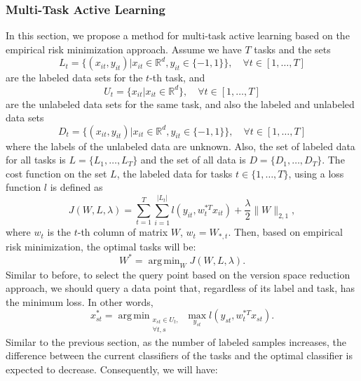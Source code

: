 \documentclass[12pt]{article}
\DeclareMathOperator*{\argmin}{arg\,min}
\begin{document}
	\subsubsection{Multi-Task Active Learning}
	In this section, we propose a method for multi-task active learning based on the empirical risk minimization approach. Assume we have $T$ tasks and the sets
	\begin{equation}
		L_t = \{(x_{it}, y_{it}) | x_{it} \in \mathbb{R}^d, y_{it} \in \{-1, 1\}\}, \quad \forall t \in [1, \ldots, T]
	\end{equation}
	are the labeled data sets for the $t$-th task, and
	\begin{equation}
		U_t = \{x_{it} | x_{it} \in \mathbb{R}^d\}, \quad \forall t \in [1, \ldots, T]
	\end{equation}
	are the unlabeled data sets for the same task, and also the labeled and unlabeled data sets
	\begin{equation}
		D_t = \{(x_{it}, y_{it}) | x_{it} \in \mathbb{R}^d, y_{it} \in \{-1, 1\}\}, \quad \forall t \in [1, \ldots, T]
	\end{equation}
	where the labels of the unlabeled data are unknown. Also, the set of labeled data for all tasks is $L = \{L_1, \ldots, L_T\}$ and the set of all data is $D = \{D_1, \ldots, D_T\}$. The cost function on the set $L$, the labeled data for tasks $t \in \{1, \ldots, T\}$, using a loss function $l$ is defined as
	\begin{equation}
		J(W, L, \lambda) = \sum_{t=1}^{T} \sum_{i=1}^{|L_t|} l(y_{it}, w_t^{*T} x_{it}) + \frac{\lambda}{2}\|W\|_{2,1},
	\end{equation}
	where $w_t$ is the $t$-th column of matrix $W$, $w_t = W_{*,t}$. Then, based on empirical risk minimization, the optimal tasks will be:
	\begin{equation}
		W^* = \argmin_{W} J(W, L, \lambda).
	\end{equation}
	Similar to before, to select the query point based on the version space reduction approach, we should query a data point that, regardless of its label and task, has the minimum loss. In other words,
	\begin{equation}
		\label{eq:mt-query}
		x^*_{st} = \argmin_{\substack{x_{st} \in U_t, \\ \forall t, s}} \max_{y_{st}} l(y_{st}, w_t^{*T} x_{st}).
	\end{equation}
	Similar to the previous section, as the number of labeled samples increases, the difference between the current classifiers of the tasks and the optimal classifier is expected to decrease. Consequently, we will have:
\end{document}
